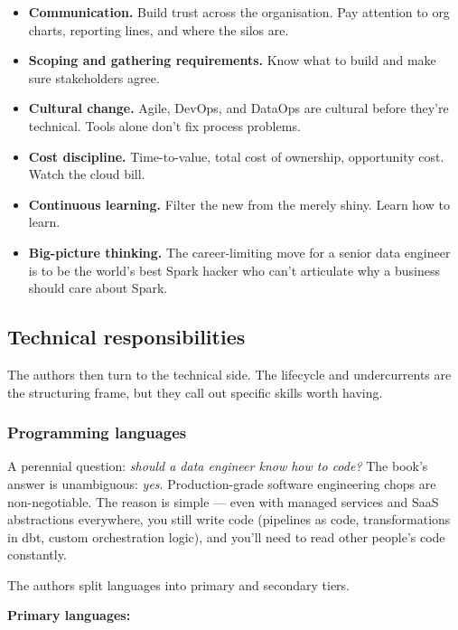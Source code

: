 \begin{itemize}[leftmargin=*]
  \item \textbf{Communication.} Build trust across the organisation. Pay attention to org charts, reporting lines, and where the silos are.
  \item \textbf{Scoping and gathering requirements.} Know what to build and make sure stakeholders agree.
  \item \textbf{Cultural change.} Agile, DevOps, and DataOps are cultural before they're technical. Tools alone don't fix process problems.
  \item \textbf{Cost discipline.} Time-to-value, total cost of ownership, opportunity cost. Watch the cloud bill.
  \item \textbf{Continuous learning.} Filter the new from the merely shiny. Learn how to learn.
  \item \textbf{Big-picture thinking.} The career-limiting move for a senior data engineer is to be the world's best Spark hacker who can't articulate why a business should care about Spark.
\end{itemize}

\subsection{Technical responsibilities}

The authors then turn to the technical side. The lifecycle and undercurrents are the structuring frame, but they call out specific skills worth having.

\subsubsection{Programming languages}

A perennial question: \emph{should a data engineer know how to code?} The book's answer is unambiguous: \emph{yes}. Production-grade software engineering chops are non-negotiable. The reason is simple — even with managed services and SaaS abstractions everywhere, you still write code (pipelines as code, transformations in dbt, custom orchestration logic), and you'll need to read other people's code constantly.

The authors split languages into primary and secondary tiers.

\textbf{Primary languages:}

